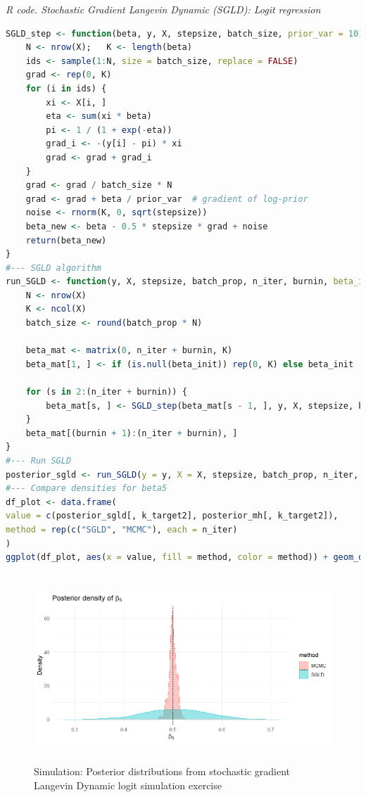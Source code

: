 \begin{tcolorbox}[enhanced,width=4.67in,center upper,
	fontupper=\large\bfseries,drop shadow southwest,sharp corners]
	\textit{R code. Stochastic Gradient Langevin Dynamic (SGLD): Logit regression}
	\begin{VF}
		\begin{lstlisting}[language=R]
SGLD_step <- function(beta, y, X, stepsize, batch_size, prior_var = 10) {
	N <- nrow(X); 	K <- length(beta)
	ids <- sample(1:N, size = batch_size, replace = FALSE)
	grad <- rep(0, K)
	for (i in ids) {
		xi <- X[i, ]
		eta <- sum(xi * beta)
		pi <- 1 / (1 + exp(-eta))
		grad_i <- -(y[i] - pi) * xi
		grad <- grad + grad_i
	}
	grad <- grad / batch_size * N
	grad <- grad + beta / prior_var  # gradient of log-prior
	noise <- rnorm(K, 0, sqrt(stepsize))
	beta_new <- beta - 0.5 * stepsize * grad + noise
	return(beta_new)
}
#--- SGLD algorithm
run_SGLD <- function(y, X, stepsize, batch_prop, n_iter, burnin, beta_init = NULL) {
	N <- nrow(X)
	K <- ncol(X)
	batch_size <- round(batch_prop * N)
	
	beta_mat <- matrix(0, n_iter + burnin, K)
	beta_mat[1, ] <- if (is.null(beta_init)) rep(0, K) else beta_init
	
	for (s in 2:(n_iter + burnin)) {
		beta_mat[s, ] <- SGLD_step(beta_mat[s - 1, ], y, X, stepsize, batch_size)
	}
	beta_mat[(burnin + 1):(n_iter + burnin), ]
}
#--- Run SGLD
posterior_sgld <- run_SGLD(y = y, X = X, stepsize, batch_prop, n_iter, burnin)
#--- Compare densities for beta5
df_plot <- data.frame(
value = c(posterior_sgld[, k_target2], posterior_mh[, k_target2]),
method = rep(c("SGLD", "MCMC"), each = n_iter)
)
ggplot(df_plot, aes(x = value, fill = method, color = method)) + geom_density(alpha = 0.4) + geom_vline(xintercept = beta_true[k_target2], linetype = "dashed", color = "black") + labs(title = expression(paste("Posterior density of ", beta[5])), x = expression(beta[5]), y = "Density") + theme_minimal()
\end{lstlisting}
	\end{VF}
\end{tcolorbox}

\begin{figure}[!h]
	\centering
	\includegraphics[width=340pt, height=200pt]{Chapters/chapter13/figures/SGLDlogit.png}
	\caption{Simulation: Posterior distributions from stochastic gradient Langevin Dynamic logit simulation exercise}
	\label{SGLDlogit}
\end{figure}  

